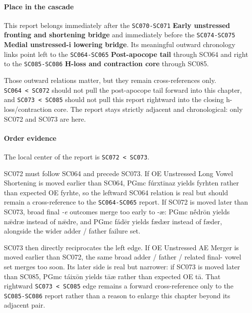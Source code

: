 \documentclass[
  british,
  a4paper,
]{article}
\begin{document}
\paragraph{Place in the cascade}\label{place-in-the-cascade-45}

This report belongs immediately after the \texttt{SC070-SC071}
\textbf{Early unstressed fronting and shortening bridge} and immediately
before the \texttt{SC074-SC075} \textbf{Medial unstressed-i lowering
bridge}. Its meaningful outward chronology links point left to the
\texttt{SC064-SC065} \textbf{Post-apocope tail} through SC064 and right
to the \texttt{SC085-SC086} \textbf{H-loss and contraction core} through
SC085.

Those outward relations matter, but they remain cross-references only.
\texttt{SC064\ \textless{}\ SC072} should not pull the post-apocope tail
forward into this chapter, and \texttt{SC073\ \textless{}\ SC085} should
not pull this report rightward into the closing h-loss/contraction core.
The report stays strictly adjacent and chronological: only SC072 and
SC073 are here.

\paragraph{Order evidence}\label{order-evidence-45}

The local center of the report is \texttt{SC072\ \textless{}\ SC073}.

SC072 must follow SC064 and precede SC073. If OE Unstressed Long Vowel
Shortening is moved earlier than SC064, PGmc fúrxtīnaz yields fyrhten
rather than expected OE fyrhte, so the leftward SC064 relation is real
but should remain a cross-reference to the \texttt{SC064-SC065} report.
If SC072 is moved later than SC073, broad final \emph{-e} outcomes merge
too early to -æ: PGmc nḗdrōn yields nǣdræ instead of nǣdre, and PGmc
fádēr yields fædær instead of fæder, alongside the wider adder / father
failure set.

SC073 then directly reciprocates the left edge. If OE Unstressed AE
Merger is moved earlier than SC072, the same broad adder / father /
related final- vowel set merges too soon. Its later side is real but
narrower: if SC073 is moved later than SC085, PGmc táixōn yields tāæ
rather than expected OE tā. That rightward
\texttt{SC073\ \textless{}\ SC085} edge remains a forward
cross-reference only to the \texttt{SC085-SC086} report rather than a
reason to enlarge this chapter beyond its adjacent pair.
\end{document}
